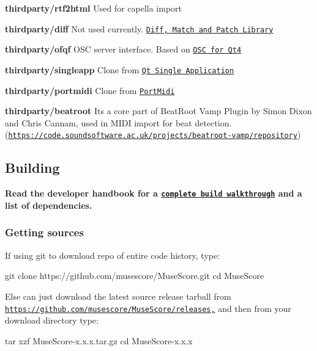 \begin{DoxyItemize}
\begin{DoxyItemize}
\item {\bfseries thirdparty/rtf2html} Used for capella import
\item {\bfseries thirdparty/diff} Not used currently. \href{https://code.google.com/p/google-diff-match-patch/}{\tt Diff, Match and Patch Library}
\item {\bfseries thirdparty/ofqf} O\+SC server interface. Based on \href{http://www.arnoldarts.de/projects/ofqf/}{\tt O\+SC for Qt4}
\item {\bfseries thirdparty/singleapp} Clone from \href{https://github.com/qtproject/qt-solutions/tree/master/qtsingleapplication}{\tt Qt Single Application}
\item {\bfseries thirdparty/portmidi} Clone from \href{https://sourceforge.net/projects/portmedia/}{\tt Port\+Midi}
\item {\bfseries thirdparty/beatroot} It\textquotesingle{}s a core part of Beat\+Root Vamp Plugin by Simon Dixon and Chris Cannam, used in M\+I\+DI import for beat detection. (\href{https://code.soundsoftware.ac.uk/projects/beatroot-vamp/repository}{\tt https\+://code.\+soundsoftware.\+ac.\+uk/projects/beatroot-\/vamp/repository})
\end{DoxyItemize}
\end{DoxyItemize}

\subsection*{Building}

{\bfseries Read the developer handbook for a \href{https://musescore.org/en/developers-handbook/compilation}{\tt complete build walkthrough} and a list of dependencies.}

\subsubsection*{Getting sources}

If using git to download repo of entire code history, type\+: \begin{DoxyVerb}git clone https://github.com/musescore/MuseScore.git
cd MuseScore
\end{DoxyVerb}


Else can just download the latest source release tarball from \href{https://github.com/musescore/MuseScore/releases,}{\tt https\+://github.\+com/musescore/\+Muse\+Score/releases,} and then from your download directory type\+: \begin{DoxyVerb}tar xzf MuseScore-x.x.x.tar.gz
cd MuseScore-x.x.x
\end{DoxyVerb}


